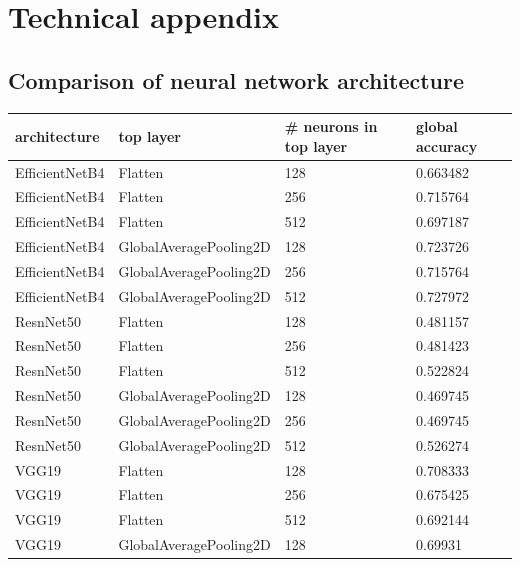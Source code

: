 \appendix
\section{Technical appendix}
\label{sec:appendix}

\subsection{Comparison of neural network architecture}
\label{sec:appendixA}

\begin{table}
    \centering
\begin{tabular}{llll}
    \toprule
    architecture & top layer & \# neurons in top layer &       global accuracy \\
    \midrule
    EfficientNetB4 &   Flatten &                    128 &  0.663482 \\
    EfficientNetB4 &   Flatten &                    256 &  0.715764 \\
    EfficientNetB4 &   Flatten &                    512 &  0.697187 \\
    EfficientNetB4 &   GlobalAveragePooling2D &                    128 &  0.723726 \\
    EfficientNetB4 &   GlobalAveragePooling2D &                    256 &  0.715764 \\
    EfficientNetB4 &   GlobalAveragePooling2D &                    512 &  0.727972 \\
        ResnNet50 &   Flatten &                    128 &  0.481157 \\
        ResnNet50 &   Flatten &                    256 &  0.481423 \\
        ResnNet50 &   Flatten &                    512 &  0.522824 \\
        ResnNet50 &   GlobalAveragePooling2D &                    128 &  0.469745 \\
        ResnNet50 &   GlobalAveragePooling2D &                    256 &  0.469745 \\
        ResnNet50 &   GlobalAveragePooling2D &                    512 &  0.526274 \\
           VGG19 &   Flatten &                    128 &  0.708333 \\
           VGG19 &   Flatten &                    256 &  0.675425 \\
           VGG19 &   Flatten &                    512 &  0.692144 \\
           VGG19 &   GlobalAveragePooling2D &                    128 &   0.69931 \\

\end{tabular}
\end{table}
